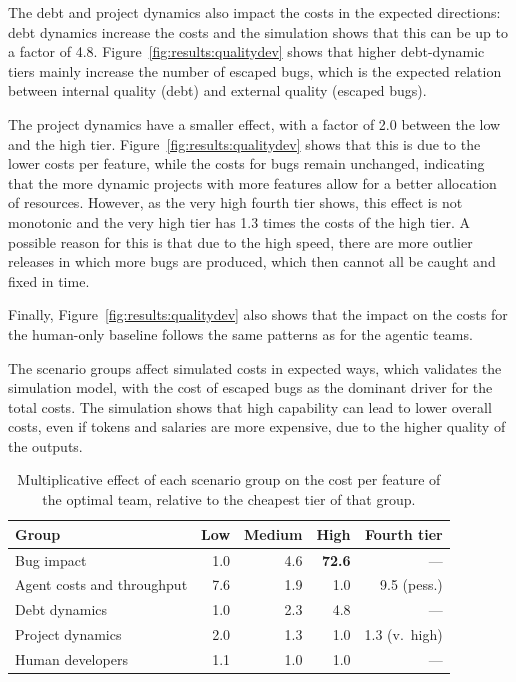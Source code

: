 \documentclass[smallextended]{svjour3}       %
\begin{document}
The debt and project dynamics also impact the costs in the expected directions: debt dynamics increase the costs and the simulation shows that this can be up to a factor of 4.8. Figure~\ref{fig:results:qualitydev} shows that higher debt-dynamic tiers mainly increase the number of escaped bugs, which is the expected relation between internal quality (debt) and external quality (escaped bugs). 

The project dynamics have a smaller effect, with a factor of 2.0 between the low and the high tier. Figure~\ref{fig:results:qualitydev} shows that this is due to the lower costs per feature, while the costs for bugs remain unchanged, indicating that the more dynamic projects with more features allow for a better allocation of resources. However, as the very high fourth tier shows, this effect is not monotonic and the very high tier has 1.3 times the costs of the high tier. A possible reason for this is that due to the high speed, there are more outlier releases in which more bugs are produced, which then cannot all be caught and fixed in time. 

Finally, Figure~\ref{fig:results:qualitydev} also shows that the impact on the costs for the human-only baseline follows the same patterns as for the agentic teams.

\begin{summarybox}
The scenario groups affect simulated costs in expected ways, which validates the simulation model, with the cost of escaped bugs as the dominant driver for the total costs. The simulation shows that high capability can lead to lower overall costs, even if tokens and salaries are more expensive, due to the higher quality of the outputs.
\end{summarybox}

\begin{table}[t]
\caption{Multiplicative effect of each scenario group on the cost per feature of the optimal team, relative to the cheapest tier of that group.}
\label{tab:results:multipliers}
\footnotesize
\begin{tabularx}{\linewidth}{Xrrrr}
\toprule
Group & Low & Medium & High & Fourth tier \\
\midrule
Bug impact         & 1.0 & 4.6 & \textbf{72.6}  & --- \\[2pt]
Agent costs and throughput & 7.6 & 1.9 & 1.0            & 9.5 (pess.) \\[2pt]
Debt dynamics      & 1.0 & 2.3 & 4.8            & --- \\[2pt]
Project dynamics   & 2.0 & 1.3 & 1.0            & 1.3 (v.\ high) \\[2pt]
Human developers   & 1.1 & 1.0 & 1.0            & --- \\
\bottomrule
\end{tabularx}
\end{table}
\end{document}
